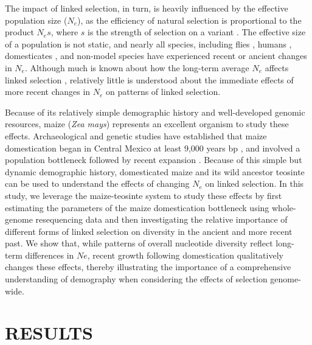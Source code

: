 \documentclass[twoside, twocolumn, letterpaper]{article}
\begin{document}
The impact of linked selection, in turn, is heavily influenced by the effective population size ($N_e$), as the  efficiency of natural selection is proportional to the product $N_es$, where $s$ is the strength of selection on a variant \cite{cutter2013, slotte2014, corbett2015,leffler2012}.
The effective size of a population is not static, and nearly all species, including flies \cite{duchen2013}, humans \cite{reich1998}, domesticates \cite{hyten2006, bovine2009}, and non-model species \cite{ellegren2014} have experienced recent or ancient changes in $N_e$. 
Although much is known about how the long-term average $N_e$ affects linked selection \cite{cutter2013}, relatively little is understood about the immediate effects of more recent changes in $N_e$ on patterns of linked selection.

Because of its relatively simple demographic history and well-developed genomic resources, maize (\emph{Zea mays}) represents an excellent organism to study these effects. 
Archaeological and genetic studies have established that maize domestication began in Central Mexico at least 9,000 years bp \cite{smith1995,matsuoka2002}, and involved a population bottleneck followed by recent expansion \cite{wright2005,eyre1998,tenaillon2004}.
Because of this simple but dynamic demographic history, domesticated maize and its wild ancestor teosinte can be used to understand the effects of changing $N_e$ on linked selection. 
In this study, we leverage the maize-teosinte system to study these effects by first estimating the parameters of the maize domestication bottleneck using whole-genome resequencing data and then investigating the relative importance of different forms of linked selection on diversity in the ancient and more recent past. 
We show that, while patterns of overall nucleotide diversity reflect long-term differences in $Ne$, recent growth following domestication qualitatively changes these effects, thereby illustrating the importance of a comprehensive understanding of demography when considering the effects of selection genome-wide. 

\section*{RESULTS}
\end{document}
